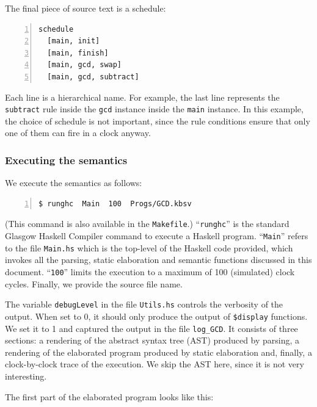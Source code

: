 \documentclass[11pt]{article}
\newcommand{\term}[1]{\texttt{#1}}
\begin{document}
The final piece of source text is a schedule:

\begin{Verbatim}[frame=single, numbers=left, commandchars=\\\{\}]
schedule
  [main, init]
  [main, finish]
  [main, gcd, swap]
  [main, gcd, subtract]
\end{Verbatim}

Each line is a hierarchical name.  For example, the last line
represents the \term{subtract} rule inside the \term{gcd} instance
inside the \term{main} instance.  In this example, the choice of
schedule is not important, since the rule conditions ensure that only
one of them can fire in a clock anyway.


\subsubsection{Executing the semantics}

We execute the semantics as follows:
\begin{Verbatim}[frame=single, numbers=left, commandchars=\\\{\}]
$ runghc  Main  100  Progs/GCD.kbsv
\end{Verbatim}

(This command is also available in the \term{Makefile}.)
``\term{runghc}'' is the standard Glasgow Haskell Compiler command to
execute a Haskell program.  ``\term{Main}'' refers to the file
\term{Main.hs} which is the top-level of the Haskell code provided,
which invokes all the parsing, static elaboration and semantic
functions discussed in this document.  ``\term{100}'' limits the
execution to a maximum of 100 (simulated) clock cycles.  Finally, we
provide the source file name.

The variable \term{debugLevel} in the file \term{Utils.hs} controls
the verbosity of the output.  When set to 0, it should only produce
the output of \verb|$display| functions.  We set it to 1 and captured
the output in the file \verb|log_GCD|.  It consists of three sections:
a rendering of the abstract syntax tree (AST) produced by parsing, a
rendering of the elaborated program produced by static elaboration
and, finally, a clock-by-clock trace of the execution.  We skip the
AST here, since it is not very interesting.

The first part of the elaborated program looks like this:
\end{document}
